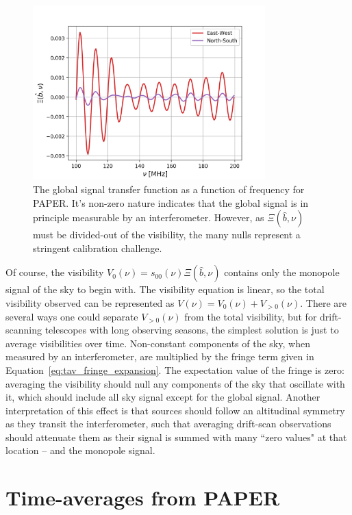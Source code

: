 \begin{figure}
\centering
\includegraphics[width=0.8\textwidth]{chapters/global_signal/figures/Xi_vis.png}
\caption[The global signal transfer function as a function of frequency for PAPER.]{The global signal transfer function as a function of frequency for PAPER. It's non-zero nature indicates that the global signal is in principle measurable by an interferometer. However, as $\Xi(\hat{b},\nu)$ must be divided-out of the visibility, the many nulls represent a stringent calibration challenge.}
\label{fig:xi_vis}
\end{figure}

Of course, the visibility $V_0(\nu) = s_{00}(\nu)\Xi(\hat{b},\nu)$ contains only the monopole signal of the sky to begin with. The visibility equation is linear, so the total visibility observed can be represented as $V(\nu) = V_0(\nu) + V_{>0}(\nu)$. There are several ways one could separate $V_{>0}(\nu)$ from the total visibility, but for drift-scanning telescopes with long observing seasons, the simplest solution is just to average visibilities over time. 
Non-constant components of the sky, when measured by an interferometer, are multiplied by the fringe term given in Equation~\ref{eq:tav_fringe_expansion}. The expectation value of the fringe is zero: averaging the visibility should null any components of the sky that oscillate with it, which should include all sky signal except for the global signal. Another interpretation of this effect is that sources should follow an altitudinal symmetry as they transit the interferometer, such that averaging drift-scan observations should attenuate them as their signal is summed with many ``zero values" at that location -- and the monopole signal.

\section{Time-averages from PAPER}

